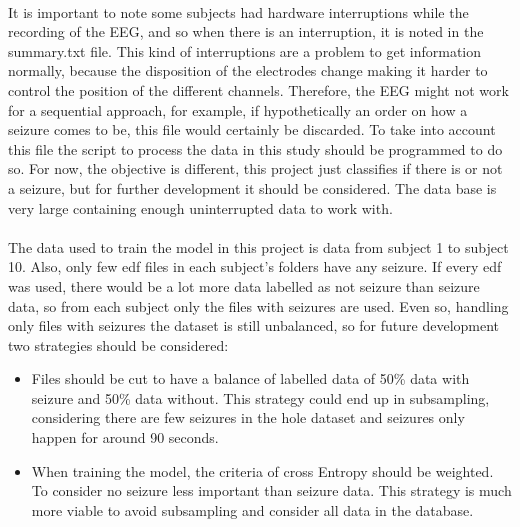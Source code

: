 \\
It is important to note some subjects had hardware interruptions while the recording of the EEG, and so when there is an interruption, it is noted in the summary.txt file. This kind of interruptions are a problem to get information normally, because the disposition of the electrodes change making it harder to control the position of the different channels. Therefore, the EEG might not work for a sequential approach, for example, if hypothetically an order on how a seizure comes to be, this file would certainly be discarded. To take into account this file the script to process the data in this study should be programmed to do so. For now, the objective is different, this project just classifies if there is or not a seizure, but for further development it should be considered. The data base is very large containing enough uninterrupted data to work with.
\\\\
The data used to train the model in this project is data from subject 1 to subject 10. Also, only few edf files in each subject’s folders have any seizure. If every edf was used, there would be a lot more data labelled as not seizure than seizure data, so from each subject only the files with seizures are used. Even so, handling only files with seizures the dataset is still unbalanced, so for future development two strategies should be considered:
\\
\begin{itemize}
  \item Files should be cut to have a balance of labelled data of 50\% data with seizure and 50\% data without. This strategy could end up in subsampling, considering there are few seizures in the hole dataset and seizures only happen for around 90 seconds.
  \item When training the model, the criteria of cross Entropy should be weighted. To consider no seizure less important than seizure data. This strategy is much more viable to avoid subsampling and consider all data in the database.
\end{itemize}
\leavevmode\\

